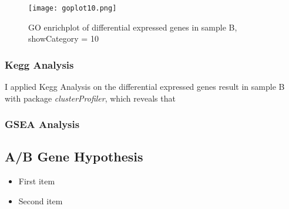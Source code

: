 \documentclass[fleqn,10pt]{wlscirep}
\begin{document}
\begin{figure}[ht]
    \centering
    \texttt{[image: goplot10.png]}
    \caption{GO enrichplot of differential expressed genes in sample B, showCategory = 10}
    \label{fig:stream}
    \end{figure}


\subsubsection{Kegg Analysis}
I applied Kegg Analysis on the differential expressed genes result in sample B with package \textit{clusterProfiler}\cite{yu2012clusterprofiler}, which reveals that 

\subsubsection{GSEA Analysis}

\subsection*{A/B Gene Hypothesis}

\begin{itemize}
\item First item
\item Second item
\end{itemize}



\end{document}
